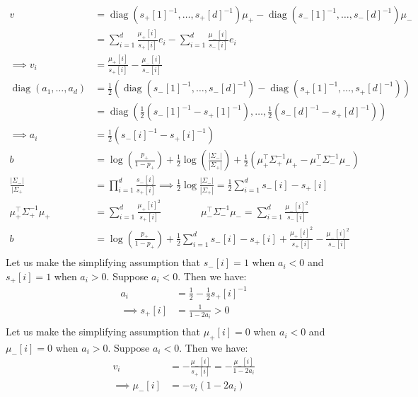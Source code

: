 \documentclass{amsart}
\DeclareMathOperator{\diag}{diag}
\theoremstyle{definition}
\begin{document}
\begin{enumerate}[(a)]
		\begin{align*}
			v &= \diag(s_+[1]^{-1}, \ldots, s_+[d]^{-1})\mu_+ - \diag(s_-[1]^{-1}, \ldots, s_-[d]^{-1})\mu_-\\
			&= \sum_{i=1}^{d}\frac{\mu_+[i]}{s_+[i]}e_i- \sum_{i=1}^{d}\frac{\mu_-[i]}{s_-[i]}e_i\\
			\implies v_i &= \frac{\mu_+[i]}{s_+[i]} - \frac{\mu_-[i]}{s_-[i]}\\
			\diag(a_1, \ldots, a_d) &= \frac{1}{2}(\diag(s_-[1]^{-1}, \ldots, s_-[d]^{-1}) - \diag(s_+[1]^{-1}, \ldots, s_+[d]^{-1}))\\
			&= \diag\left(\frac12\left(s_-[1]^{-1} - s_+[1]^{-1}\right), \ldots, \frac12\left(s_-[d]^{-1} - s_+[d]^{-1}\right)\right)\\
			\implies a_i &= \frac12\left(s_-[i]^{-1} - s_+[i]^{-1}\right)\\
			b &= \log\left(\frac{p_+}{1-p_+}\right) + \frac12 \log\left(\frac{|\Sigma_-|}{|\Sigma_+|}\right) + \frac{1}{2}(\mu_+^\intercal\Sigma_{+}^{-1}\mu_+ - \mu_-^\intercal\Sigma_{-}^{-1}\mu_-)\\
			\frac{|\Sigma_-|}{|\Sigma_+} &= \prod_{i=1}^{d}\frac{s_-[i]}{s_+[i]} \implies \frac{1}{2} \log \frac{|\Sigma_-|}{|\Sigma_+|} = \frac12\sum_{i=1}^{d} s_-[i] - s_+[i]\\
			\mu_+^\intercal\Sigma_{+}^{-1}\mu_+ &= \sum_{i=1}^{d}\frac{\mu_+[i]^2}{s_+[i]}\qquad\qquad \mu_-^\intercal\Sigma_{-}^{-1}\mu_- = \sum_{i=1}^{d}\frac{\mu_-[i]^2}{s_-[i]}\\
			b &= \log\left(\frac{p_+}{1-p_+}\right) + \frac12\sum_{i=1}^{d} s_-[i] - s_+[i]+ \frac{\mu_+[i]^2}{s_+[i]} - \frac{\mu_-[i]^2}{s_-[i]}\\
		\end{align*}
		Let us make the simplifying assumption that $s_-[i]=1$ when $a_i <0$ and $s_+[i] = 1$ when $a_i > 0$. Suppose $a_i < 0$. Then we have:
		\begin{align*}
			a_i &= \frac{1}{2} - \frac12 s_+[i]^{-1}\\
			\implies s_+[i] &= \frac{1}{1-2a_i} > 0\\
		\end{align*}
		Let us make the simplifying assumption that $\mu_+[i] = 0$ when $a_i <0$ and $\mu_-[i] = 0$ when $a_i > 0$. Suppose $a_i < 0$. Then we have:
		\begin{align*}
			v_i &= -\frac{\mu_{-}[i]}{s_+[i]} = -\frac{\mu_{-}[i]}{1-2a_i}\\
			\implies \mu_{-}[i] &= -v_i(1-2a_i)\\
		\end{align*}

\end{enumerate}
\end{document}
